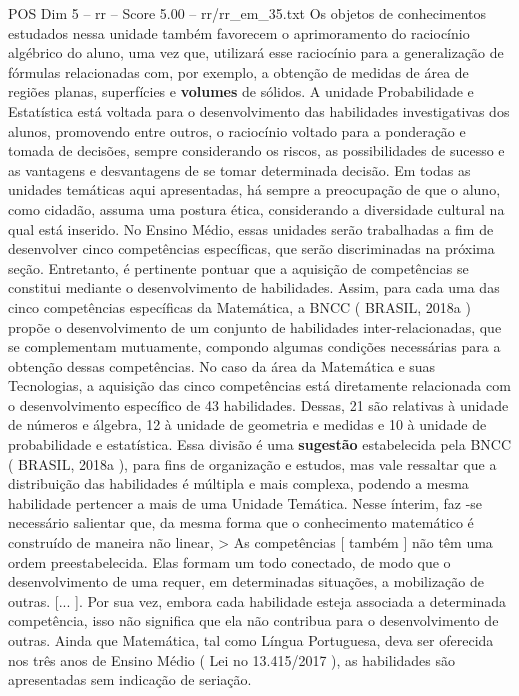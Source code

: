 \begin{textsample}{POS Dim 5 – rr – Score 5.00 – rr/rr\_em\_35.txt}
Os objetos de conhecimentos estudados nessa unidade também favorecem o aprimoramento do raciocínio algébrico do aluno, uma vez que, utilizará esse raciocínio para a generalização de fórmulas relacionadas com, por exemplo, a obtenção de medidas de área de regiões planas, superfícies e \textbf{volumes} de sólidos.
A unidade Probabilidade e Estatística está voltada para o desenvolvimento das habilidades investigativas dos alunos, promovendo entre outros, o raciocínio voltado para a ponderação e tomada de decisões, sempre considerando os riscos, as possibilidades de sucesso e as vantagens e desvantagens de se tomar determinada decisão.
Em todas as unidades temáticas aqui apresentadas, há sempre a preocupação de que o aluno, como cidadão, assuma uma postura ética, considerando a diversidade cultural na qual está inserido.
No Ensino Médio, essas unidades serão trabalhadas a fim de desenvolver cinco competências específicas, que serão discriminadas na próxima seção.
Entretanto, é pertinente pontuar que a aquisição de competências se constitui mediante o desenvolvimento de habilidades.
Assim, para cada uma das cinco competências específicas da Matemática, a BNCC ( BRASIL, 2018a ) propõe o desenvolvimento de um conjunto de habilidades inter-relacionadas, que se complementam mutuamente, compondo algumas condições necessárias para a obtenção dessas competências.
No caso da área da Matemática e suas Tecnologias, a aquisição das cinco competências está diretamente relacionada com o desenvolvimento específico de 43 habilidades.
Dessas, 21 são relativas à unidade de números e álgebra, 12 à unidade de geometria e medidas e 10 à unidade de probabilidade e estatística.
Essa divisão é uma \textbf{sugestão} estabelecida pela BNCC ( BRASIL, 2018a ), para fins de organização e estudos, mas vale ressaltar que a distribuição das habilidades é múltipla e mais complexa, podendo a mesma habilidade pertencer a mais de uma Unidade Temática.
Nesse ínterim, faz -se necessário salientar que, da mesma forma que o conhecimento matemático é construído de maneira não linear, > As competências [ também ] não têm uma ordem preestabelecida.
Elas formam um todo conectado, de modo que o desenvolvimento de uma requer, em determinadas situações, a mobilização de outras. [... ].
Por sua vez, embora cada habilidade esteja associada a determinada competência, isso não significa que ela não contribua para o desenvolvimento de outras.
Ainda que Matemática, tal como Língua Portuguesa, deva ser oferecida nos três anos de Ensino Médio ( Lei no 13.415/2017 ), as habilidades são apresentadas sem indicação de seriação.

\end{textsample}
